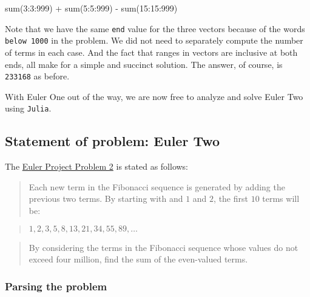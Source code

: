 \documentclass[
  a4paper,
]{article}
\newenvironment{Shaded}{\begin{snugshade}}{\end{snugshade}}
\newcommand{\FloatTok}[1]{\textcolor[rgb]{0.75,0.75,0.82}{#1}}
\newcommand{\FunctionTok}[1]{\textcolor[rgb]{0.94,0.94,0.56}{#1}}
\newcommand{\NormalTok}[1]{\textcolor[rgb]{0.80,0.80,0.80}{#1}}
\newcommand{\OperatorTok}[1]{\textcolor[rgb]{0.94,0.94,0.82}{#1}}
\begin{document}
\begin{Shaded}
\begin{Highlighting}[]
\FunctionTok{sum}\NormalTok{(}\FloatTok{3}\OperatorTok{:}\FloatTok{3}\OperatorTok{:}\FloatTok{999}\NormalTok{) }\OperatorTok{+} \FunctionTok{sum}\NormalTok{(}\FloatTok{5}\OperatorTok{:}\FloatTok{5}\OperatorTok{:}\FloatTok{999}\NormalTok{) }\OperatorTok{{-}} \FunctionTok{sum}\NormalTok{(}\FloatTok{15}\OperatorTok{:}\FloatTok{15}\OperatorTok{:}\FloatTok{999}\NormalTok{)}
\end{Highlighting}
\end{Shaded}

Note that we have the same \texttt{end} value for the three vectors
because of the words \texttt{below\ 1000} in the problem. We did not
need to separately compute the number of terms in each case. And the
fact that ranges in vectors are inclusive at both ends, all make for a
simple and succinct solution. The answer, of course, is \texttt{233168}
as before.

With Euler One out of the way, we are now free to analyze and solve
Euler Two using \texttt{Julia}.

\hypertarget{statement-of-problem-euler-two}{%
\subsection{Statement of problem: Euler
Two}\label{statement-of-problem-euler-two}}

The \href{https://projecteuler.net/problem=2}{Euler Project Problem 2}
is stated as follows:

\begin{quote}
Each new term in the Fibonacci sequence is generated by adding the
previous two terms. By starting with and \(1\) and \(2\), the first
\(10\) terms will be:
\end{quote}

\begin{quote}
\(1, 2, 3, 5, 8, 13, 21, 34, 55, 89, \ldots\)
\end{quote}

\begin{quote}
By considering the terms in the Fibonacci sequence whose values do not
exceed four million, find the sum of the even-valued terms.
\end{quote}

\hypertarget{parsing-the-problem}{%
\subsubsection{Parsing the problem}\label{parsing-the-problem}}
\end{document}
